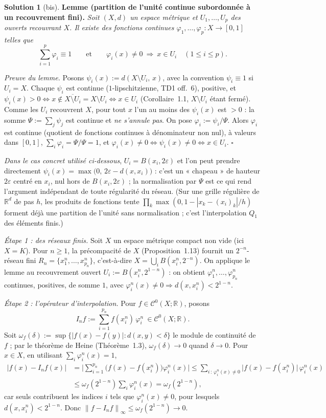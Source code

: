 \documentclass[11pt,a4paper]{article}
\newcommand{\R}{\mathbb{R}}
\newcommand{\adh}[1]{\overline{#1}}
\newcommand{\norm}[1]{\left\|#1\right\|}
\newcommand{\Cz}{\mathcal{C}^0}
\newcommand{\ie}{c'est-à-dire}
\theoremstyle{definition}
\newtheorem*{solution}{Solution}
\begin{document}
\begin{solution}[bis]
\textbf{Lemme (partition de l'unité continue subordonnée à un recouvrement fini).} \emph{Soit $(X,d)$ un espace métrique et $U_1,\dots,U_p$ des ouverts recouvrant $X$. Il existe des fonctions continues $\varphi_1,\dots,\varphi_p:X\to[0,1]$ telles que}
\[
\sum_{i=1}^p\varphi_i\equiv1\qquad\text{et}\qquad\varphi_i(x)\ne0\ \Longrightarrow\ x\in U_i\quad(1\le i\le p).
\]

\emph{Preuve du lemme.} Posons $\psi_i(x):=d(X\setminus U_i,\,x)$, avec la convention $\psi_i\equiv1$ si $U_i=X$. Chaque $\psi_i$ est continue ($1$-lipschitzienne, TD1 off.~6), positive, et $\psi_i(x)>0\iff x\notin\adh{X\setminus U_i}=X\setminus U_i\iff x\in U_i$ (Corollaire~1.1, $X\setminus U_i$ étant fermé). Comme les $U_i$ recouvrent $X$, pour tout $x$ l'un au moins des $\psi_i(x)$ est $>0$ : la somme $\Psi:=\sum_j\psi_j$ est continue et \emph{ne s'annule pas}. On pose $\varphi_i:=\psi_i/\Psi$. Alors $\varphi_i$ est continue (quotient de fonctions continues à dénominateur non nul), à valeurs dans $[0,1]$, $\sum_i\varphi_i=\Psi/\Psi=1$, et $\varphi_i(x)\ne0\iff\psi_i(x)\ne0\iff x\in U_i$. \hfill$\square$

\emph{Dans le cas concret utilisé ci-dessous}, $U_i=B(x_i,2\varepsilon)$ et l'on peut prendre directement $\psi_i(x)=\max\big(0,\,2\varepsilon-d(x,x_i)\big)$ : c'est un « chapeau » de hauteur $2\varepsilon$ centré en $x_i$, nul hors de $B(x_i,2\varepsilon)$ ; la normalisation par $\Psi$ est ce qui rend l'argument indépendant de toute régularité du réseau. (Sur une grille régulière de $\R^d$ de pas $h$, les produits de fonctions tente $\prod_k\max(0,1-|x_k-(x_i)_k|/h)$ forment déjà une partition de l'unité sans normalisation ; c'est l'interpolation $Q_1$ des éléments finis.)

\medskip
\noindent\emph{Étape 1 : des réseaux finis.} Soit $X$ un espace métrique compact non vide (ici $X=K$). Pour $n\ge1$, la précompacité de $X$ (Proposition~1.13) fournit un $2^{-n}$-réseau fini $R_n=\{x^n_1,\dots,x^n_{p_n}\}$, \ie{} $X=\bigcup_iB(x^n_i,2^{-n})$. On applique le lemme au recouvrement ouvert $U_i:=B(x^n_i,2^{1-n})$ : on obtient $\varphi^n_1,\dots,\varphi^n_{p_n}$ continues, positives, de somme $1$, avec $\varphi^n_i(x)\ne0\Rightarrow d(x,x^n_i)<2^{1-n}$.

\emph{Étape 2 : l'opérateur d'interpolation.} Pour $f\in\Cz(X;\R)$, posons
\[
I_nf:=\sum_{i=1}^{p_n}f(x^n_i)\,\varphi^n_i\ \in\Cz(X;\R).
\]
Soit $\omega_f(\delta):=\sup\{|f(x)-f(y)| : d(x,y)<\delta\}$ le module de continuité de $f$ ; par le théorème de Heine (Théorème~1.3), $\omega_f(\delta)\to0$ quand $\delta\to0$. Pour $x\in X$, en utilisant $\sum_i\varphi^n_i(x)=1$,
\begin{align*}
\big|f(x)-I_nf(x)\big|&=\Big|\sum_{i=1}^{p_n}\big(f(x)-f(x^n_i)\big)\varphi^n_i(x)\Big|
\le\sum_{i\,:\,\varphi^n_i(x)\ne0}\big|f(x)-f(x^n_i)\big|\,\varphi^n_i(x)\\
&\le\omega_f(2^{1-n})\sum_i\varphi^n_i(x)=\omega_f(2^{1-n}),
\end{align*}
car seuls contribuent les indices $i$ tels que $\varphi^n_i(x)\ne0$, pour lesquels $d(x,x^n_i)<2^{1-n}$. Donc $\norm{f-I_nf}_\infty\le\omega_f(2^{1-n})\to0$.


\end{solution}
\end{document}
